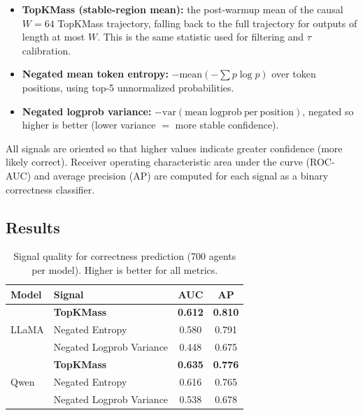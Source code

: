 \documentclass[11pt]{article}
\begin{document}
\begin{itemize}[leftmargin=*, itemsep=2pt]
  \item \textbf{TopKMass (stable-region mean):} the post-warmup mean of the
        causal $W=64$ TopKMass trajectory, falling back to the full trajectory
        for outputs of length at most $W$. This is the same statistic used for
        filtering and $\tau$ calibration.
  \item \textbf{Negated mean token entropy:} $-\mathrm{mean}(-\sum p \log p)$
        over token positions, using top-5 unnormalized probabilities.
  \item \textbf{Negated logprob variance:} $-\mathrm{var}(\mathrm{mean~logprob~per~position})$,
        negated so higher is better (lower variance $=$ more stable confidence).
\end{itemize}

All signals are oriented so that higher values indicate greater confidence (more
likely correct). Receiver operating characteristic area under the curve
(ROC-AUC) and average precision (AP) are computed for each signal as a binary
correctness classifier.

\subsection{Results}
\label{sec:exp2-results}

\begin{table}[h]
\centering
\caption{Signal quality for correctness prediction (700 agents per model).
  Higher is better for all metrics.}
\label{tab:signal-quality}
{\scriptsize
\setlength{\tabcolsep}{4pt}
\renewcommand{\arraystretch}{1.04}
\begin{tabularx}{\columnwidth}{lXcc}
\toprule
\textbf{Model} & \textbf{Signal} & \textbf{AUC} & \textbf{AP} \\
\midrule
\multirow{3}{*}{LLaMA}
  & \textbf{TopKMass}        & \textbf{0.612} & \textbf{0.810} \\
  & Negated Entropy          & 0.580 & 0.791 \\
  & Negated Logprob Variance & 0.448 & 0.675 \\
\midrule
\multirow{3}{*}{Qwen}
  & \textbf{TopKMass}        & \textbf{0.635} & \textbf{0.776} \\
  & Negated Entropy          & 0.616 & 0.765 \\
  & Negated Logprob Variance & 0.538 & 0.678 \\
\bottomrule
\end{tabularx}
}
\end{table}
\end{document}
